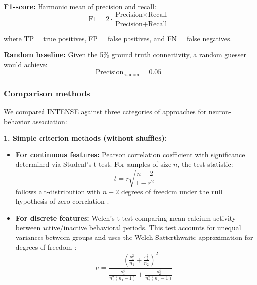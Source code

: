 \textbf{F1-score:} Harmonic mean of precision and recall:
\begin{equation}
\label{eq:f1score}
\text{F1} = 2 \cdot \frac{\text{Precision} \times \text{Recall}}{\text{Precision} +
\text{Recall}}
\end{equation}

where TP = true positives, FP = false positives, and FN = false negatives.

\textbf{Random baseline:} Given the 5\% ground truth connectivity, a random guesser
would achieve:
\begin{equation}
\label{eq:random_baseline}
\text{Precision}_{\text{random}} = 0.05
\end{equation}

\subsubsection{Comparison methods}
\label{sec:comparison_methods}

We compared INTENSE against three categories of approaches for neuron-behavior
association:

\textbf{1. Simple criterion methods (without shuffles):}
\begin{itemize}
\item \textbf{For continuous features:} Pearson correlation coefficient with
significance determined via Student's t-test. For samples of size $n$, the test
statistic:
\begin{equation}
\label{eq:pearson_test}
t = r\sqrt{\frac{n-2}{1-r^2}}
\end{equation}
follows a t-distribution with $n-2$ degrees of freedom under the null hypothesis of
zero correlation \citep{Fisher1915}.

\item \textbf{For discrete features:} Welch's t-test comparing mean calcium activity
between active/inactive behavioral periods. This test accounts for unequal
variances between groups and uses the Welch-Satterthwaite approximation for degrees
of freedom \citep{Welch1947}:
\begin{equation}
\label{eq:welch_df}
\nu = \frac{\left(\frac{s_1^2}{n_1} +
\frac{s_2^2}{n_2}\right)^2}{\frac{s_1^4}{n_1^2(n_1-1)} + \frac{s_2^4}{n_2^2(n_2-1)}}
\end{equation}
\end{itemize}

